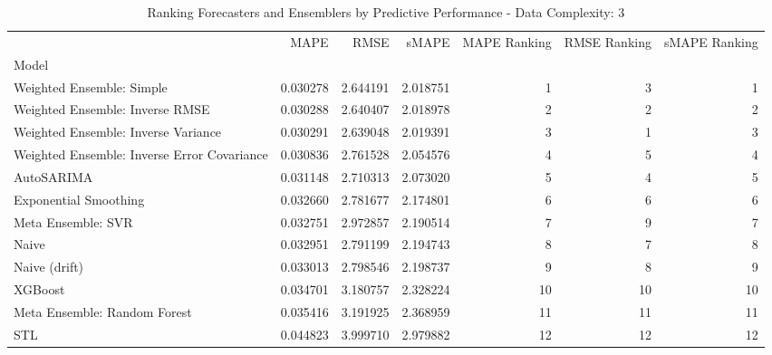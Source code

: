 \begin{table}
\caption{Ranking Forecasters and Ensemblers by Predictive Performance - Data Complexity: 3}
\begin{tabular}{lrrrrrr}
\toprule
 & MAPE & RMSE & sMAPE & MAPE Ranking & RMSE Ranking & sMAPE Ranking \\
Model &  &  &  &  &  &  \\
\midrule
Weighted Ensemble: Simple & 0.030278 & 2.644191 & 2.018751 & 1 & 3 & 1 \\
Weighted Ensemble: Inverse RMSE & 0.030288 & 2.640407 & 2.018978 & 2 & 2 & 2 \\
Weighted Ensemble: Inverse Variance & 0.030291 & 2.639048 & 2.019391 & 3 & 1 & 3 \\
Weighted Ensemble: Inverse Error Covariance & 0.030836 & 2.761528 & 2.054576 & 4 & 5 & 4 \\
AutoSARIMA & 0.031148 & 2.710313 & 2.073020 & 5 & 4 & 5 \\
Exponential Smoothing & 0.032660 & 2.781677 & 2.174801 & 6 & 6 & 6 \\
Meta Ensemble: SVR & 0.032751 & 2.972857 & 2.190514 & 7 & 9 & 7 \\
Naive & 0.032951 & 2.791199 & 2.194743 & 8 & 7 & 8 \\
Naive (drift) & 0.033013 & 2.798546 & 2.198737 & 9 & 8 & 9 \\
XGBoost & 0.034701 & 3.180757 & 2.328224 & 10 & 10 & 10 \\
Meta Ensemble: Random Forest & 0.035416 & 3.191925 & 2.368959 & 11 & 11 & 11 \\
STL & 0.044823 & 3.999710 & 2.979882 & 12 & 12 & 12 \\
\bottomrule
\end{tabular}
\end{table}
